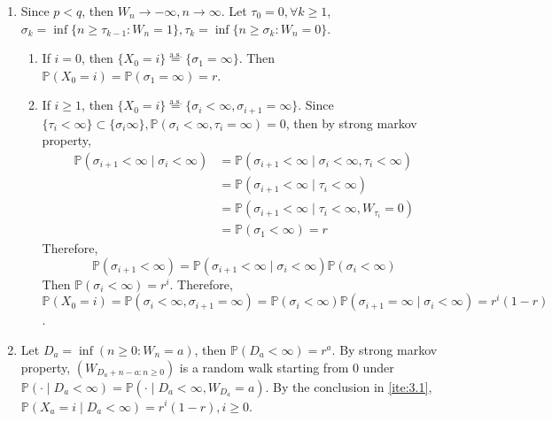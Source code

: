 \documentclass{ctexart}
\begin{document}
\begin{solution}
  \begin{enumerate}
    \item Since \(p <q\), then \(W_n \to -\infty,n \to \infty\). Let \(\tau_0=0, \forall k \geq 1\),
      \(\sigma_k=\inf \{n \geq \tau_{k-1}:W_n=1\},\tau_k=\inf \{n \geq \sigma_k:W_n=0\}\).
      \begin{enumerate}
        \item If \(i=0\), then \(\{X_0=i\}\overset{\text{a.s.}}{=}\{\sigma_1=\infty\}\). Then \(\mathbb{P}(X_0=i)=\mathbb{P}(\sigma_1=\infty)=r\).
        \item If \(i \geq 1\), then \(\{X_0=i\}\overset{\text{a.s.}}{=}\{\sigma_i <\infty,\sigma_{i + 1}=\infty\}\).
          Since \(\{\tau_{i} <\infty\} \subset \{\sigma_{i} \infty\}, \mathbb{P}(\sigma_i <\infty, \tau_i = \infty)=0\),
          then by strong markov property,
          \[
            \begin{aligned}
              \mathbb{P}(\sigma_{i + 1} <\infty \mid \sigma_{i} < \infty) & = \mathbb{P}(\sigma_{i + 1} < \infty \mid \sigma_i <\infty, \tau_i < \infty) \\
                                                                          & =\mathbb{P}(\sigma_{i + 1}<\infty \mid \tau_i < \infty)                      \\
                                                                          & =\mathbb{P}(\sigma_{i + 1}< \infty \mid \tau_i < \infty, W_{\tau_i}=0)       \\
                                                                          & =\mathbb{P}(\sigma_1 < \infty)=r
            \end{aligned}
          \]
          Therefore,
          \[
            \mathbb{P}(\sigma_{i + 1} < \infty)=\mathbb{P}(\sigma_{i + 1}<\infty \mid \sigma_i < \infty )\mathbb{P}(\sigma_i < \infty)
          \]
          Then \(\mathbb{P}(\sigma_{i }<\infty)=r^i\).
          Therefore, \(\mathbb{P}(X_0=i)=\mathbb{P}(\sigma_i < \infty,\sigma_{i + 1}=\infty)=\mathbb{P}(\sigma_i < \infty) \mathbb{P}(\sigma_{i + 1}=\infty \mid \sigma_i < \infty)=r^i(1-r)\).
      \end{enumerate}
    \item Let \(D_a=\inf (n \geq 0: W_n=a)\), then \(\mathbb{P}(D_a < \infty)=r^a\). By strong markov property,
      \((W_{D_a + n-a:n \geq 0})\) is a random walk starting from \(0\) under \(\mathbb{P}(\cdot \mid D_a < \infty)=\mathbb{P}(\cdot \mid D_a < \infty, W_{D_a}=a)\).
      By the conclusion in \ref{ite:3.1}, \(\mathbb{P}(X_a=i \mid D_a < \infty)=r^i(1-r), i \geq 0\).

\end{enumerate}
\end{solution}
\end{document}
